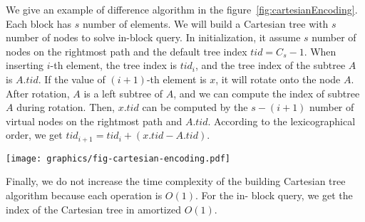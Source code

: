 \iffalse 為了解決在線詢問操作，取 $s = \frac{\log n}{4}$。根據字典順序
的編碼性質，一開始建立虛設點 $s$ 個在右鏈上，其樹編號 $\mathit{tid} =
C_s - 1$ 。隨著插入元素的增加，尚未加入的元素都預設嚴格遞減，加上根據
編碼順序，我們藉由差值來維護在線編碼 (如圖
~\ref{fig:cartesianEncoding})。根據上述的編碼想法，我們得到算法
~\ref{alg:cartesian-encode-online}。\fi

We give an example of difference algorithm in the
figure~\ref{fig:cartesianEncoding}.  Each block has $s$ number of
elements.  We will build a Cartesian tree with $s$ number of nodes to
solve in-block query.  In initialization, it assume $s$ number of nodes
on the rightmost path and the default tree index $\mathit{tid} = C_s -
1$.  When inserting $i$-th element, the tree index is $\mathit{tid}_i$,
and the tree index of the subtree $A$ is $A.\mathit{tid}$.  If the value
of $(i+1)$-th element is $x$, it will rotate onto the node $A$.  After
rotation, $A$ is a left subtree of $A$, and we can compute the index of
subtree $A$ during rotation.  Then, $x.\mathit{tid}$ can be computed by
the $s-(i+1)$ number of virtual nodes on the rightmost path and
$A.\mathit{tid}$.  According to the lexicographical order, we get
$\mathit{tid}_{i+1} = \mathit{tid}_i + (x.\mathit{tid} -
A.\mathit{tid})$.



\begin{figure*}[!thb]
  \centering
  \texttt{[image: graphics/fig-cartesian-encoding.pdf]}

  \caption{An example for difference algorithm to encode Cartesian tree.}

  \label{fig:cartesianEncoding}
\end{figure*}

Finally, we do not increase the time complexity of the building
Cartesian tree algorithm because each operation is $O(1)$.  For the in-
block query, we get the index of the Cartesian tree in amortized $O(1)$.

\iffalse
最後，我們不改變原本的建立笛卡爾樹算法，便能在過程中擭得樹的編號，
每一次的 in-block 詢問只需要一次記憶體存取，得到任一操作攤銷複雜度 $\theta(1)$。
\fi
